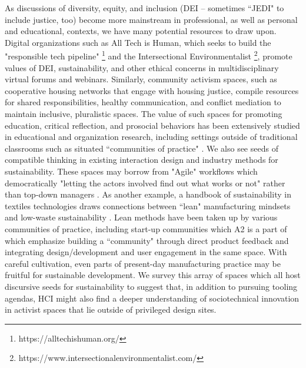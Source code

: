 \documentclass[manuscript,review,anonymous]{acmart}
\begin{document}
As discussions of diversity, equity, and inclusion (DEI -- sometimes ``JEDI" to include justice, too) become more mainstream in professional, as well as personal and educational, contexts, we have many potential resources to draw upon. Digital organizations such as All Tech is Human, which seeks to build the "responsible tech pipeline" \footnote{https://alltechishuman.org/} and the Intersectional Environmentalist \footnote{https://www.intersectionalenvironmentalist.com/}, promote values of DEI, sustainability, and other ethical concerns in multidisciplinary virtual forums and webinars. Similarly, community activism spaces, such as cooperative housing networks that engage with housing justice, compile resources for shared responsibilities, healthy communication, and conflict mediation \cite{nahc_national_nodate, aorta_aorta_2021} to maintain inclusive, pluralistic spaces.
The value of such spaces for promoting education, critical reflection, and prosocial behaviors has been extensively studied in educational and organization research, including settings outside of traditional classrooms such as situated ``communities of practice" \cite{wenger_communities_1999}.
We also see seeds of compatible thinking in existing interaction design and industry methods for sustainability. These spaces may borrow from "Agile" workflows which democratically "letting the actors involved find out what works or not" rather than top-down managers \cite{rolland_scaling_2016}. As another example, a handbook of sustainability in textiles technologies draws connections between ``lean" manufacturing mindsets and low-waste sustainability \cite{muthu_textiles_2017}. Lean methods have been taken up by various communities of practice, including start-up communities which A2 is a part of \cite{ries_lean_2011} which emphasize building a ``community" through direct product feedback and integrating design/development and user engagement in the same space. With careful cultivation, even parts of present-day manufacturing practice may be fruitful for sustainable development. We survey this array of spaces which all host discursive seeds for sustainability to suggest that, in addition to pursuing tooling agendas, HCI might also find a deeper understanding of sociotechnical innovation in activist spaces that lie outside of privileged design sites.


\end{document}
